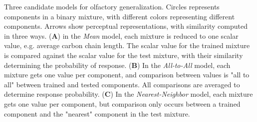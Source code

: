 \label{fig:cartoon}
Three candidate models for olfactory generalization.  Circles represents components in a binary mixture, with different colors representing different components.  Arrows show perceptual representations, with similarity computed in three ways. (\textbf{A}) in the \textit{Mean} model, each mixture is reduced to one scalar value, e.g. average carbon chain length.  The scalar value for the trained mixture is compared against the scalar value for the test mixture, with their similarity determining the probability of response. (\textbf{B}) In the \textit{All-to-All} model, each mixture gets one value per component, and comparison between values is "all to all" between trained and tested components.  All comparisons are averaged to determine response probability. (\textbf{C}) In the \textit{Nearest-Neighbor} model, each mixture gets one value per component, but comparison only occurs between a trained component and the "nearest" component in the test mixture.  